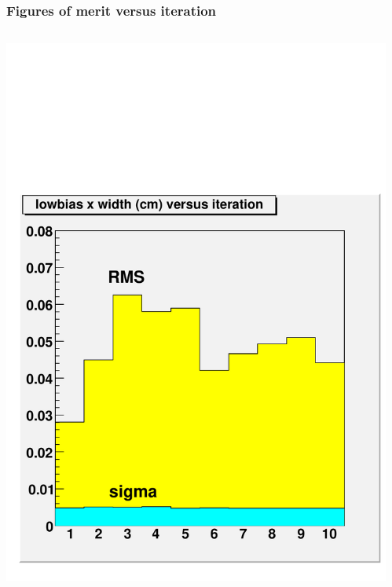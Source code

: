 \documentclass[compress]{beamer}
\begin{document}
\begin{frame}
\frametitle{Figures of merit versus iteration}
\begin{columns}
\begin{center}
\includegraphics[width=\linewidth]{realplots/x_width_vsiter_lowbias}
\end{center}
\begin{center}

\end{center}
\end{columns}
\end{frame}
\end{document}
